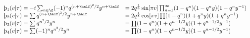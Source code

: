 \begin{equation}  \label{t6}
  \begin{array}{ll}
\th_1(v|\tau)= -i \sum_{n\in\Z} (-1)^n q^{(n+\half)^2/2} y^{n+\half} 
   &= 2q^{1\over 8}\sin[\pi v]\prod_{n=1}^{\infty}
   (1-q^n)(1-q^n y)(1-q^n y^{-1})\\
\th_2(v|\tau)=\sum q^{(n+\half)^2/2} y^{n+\half}
&=2q^{1\over 8}\cos[\pi v]\prod (1-q^n)(1+q^n y)(1+q^n y^{-1})\\
\th_3(v|\tau)= \sum q^{n^2/2} y^n
&=\prod (1-q^n)(1+q^{n-1/2} y)(1+q^{n-1/2} y^{-1})\\
\th_4(v|\tau)= \sum (-1)^n q^{n^2/2} y^n 
&=\prod (1-q^n)(1-q^{n-1/2} y)(1-q^{n-1/2} y^{-1})
  \end{array}
\end{equation}

